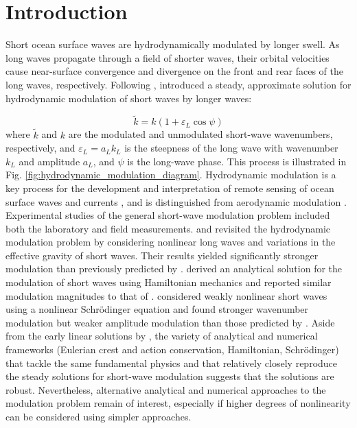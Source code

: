 \documentclass[lineno]{jfm}
\begin{document}

\section{Introduction}

Short ocean surface waves are hydrodynamically modulated by longer swell.
As long waves propagate through a field of shorter waves, their orbital
velocities cause near-surface convergence and divergence on the front and rear
faces of the long waves, respectively.
Following \citet{unna1941white,unna1942waves,unna1947sea},
\citet{longuet1960changes} introduced a steady, approximate solution for
hydrodynamic modulation of short waves by longer waves:

\begin{equation}
\label{eq:lhs1960wavenumber}
\widetilde{k} = k (1 + \varepsilon_L \cos{\psi})
\end{equation}
where $\widetilde{k}$ and $k$ are the modulated and unmodulated short-wave wavenumbers,
respectively, and $\varepsilon_L = a_L k_L$ is the steepness of the long wave with
wavenumber $k_L$ and amplitude $a_L$, and $\psi$ is the long-wave phase.
This process is illustrated in Fig. \ref{fig:hydrodynamic_modulation_diagram}.
Hydrodynamic modulation is a key process for the development and
interpretation of remote sensing of ocean surface waves and currents
\citep{keller1975microwave,alpers1978two,hara1994hydrodynamic}, and is distinguished
from aerodynamic modulation \citep{donelan1987effect,belcher1999wave,chen2000effects}.
Experimental studies of the general short-wave modulation problem included both
the laboratory \citep[e.g.,][]{keller1975microwave,donelan2010modulation} and field
\citep[e.g.,][]{hara2003observation,plant1977studies} measurements.
\citet{phillips1981dispersion} and \citet{longuet1987propagation} revisited the
hydrodynamic modulation problem by considering nonlinear long waves and
variations in the effective gravity of short waves.
Their results yielded significantly stronger modulation than previously predicted
by \citet{longuet1960changes}.
\citet{henyey1988energy} derived an analytical solution for the modulation of
short waves using Hamiltonian mechanics and reported similar modulation magnitudes
to that of \citet{longuet1987propagation}.
\citet{zhang1990evolution} considered weakly nonlinear short waves
using a nonlinear Schr\" odinger equation and found stronger wavenumber
modulation but weaker amplitude modulation than those predicted by
\citet{longuet1987propagation}.
Aside from the early linear solutions by \citet{longuet1960changes}, the variety
of analytical and numerical frameworks (Eulerian crest and action conservation,
Hamiltonian, Schr\" odinger) that tackle the same fundamental
physics and that relatively closely reproduce the steady solutions for short-wave
modulation suggests that the solutions are robust.
Nevertheless, alternative analytical and numerical approaches to the modulation
problem remain of interest, especially if higher degrees of nonlinearity can be
considered using simpler approaches.
\end{document}
